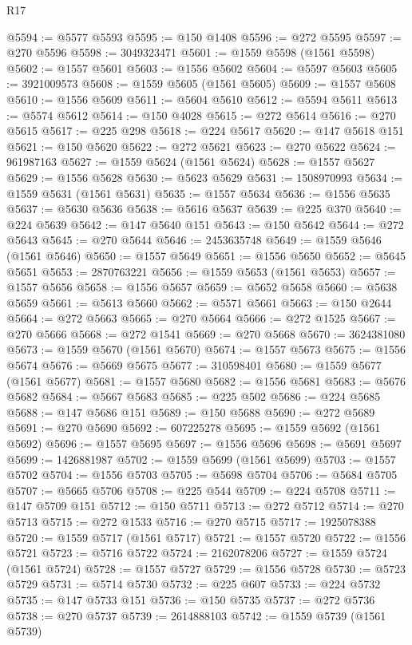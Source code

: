 \begin{lexlean}{R17}
\begin{coremodule}
@5594 := @5577 @5593
@5595 := @150 @1408
@5596 := @272 @5595
@5597 := @270 @5596
@5598 := 3049323471
@5601 := @1559 @5598 (@1561 @5598)
@5602 := @1557 @5601
@5603 := @1556 @5602
@5604 := @5597 @5603
@5605 := 3921009573
@5608 := @1559 @5605 (@1561 @5605)
@5609 := @1557 @5608
@5610 := @1556 @5609
@5611 := @5604 @5610
@5612 := @5594 @5611
@5613 := @5574 @5612
@5614 := @150 @4028
@5615 := @272 @5614
@5616 := @270 @5615
@5617 := @225 @298
@5618 := @224 @5617
@5620 := @147 @5618 @151
@5621 := @150 @5620
@5622 := @272 @5621
@5623 := @270 @5622
@5624 := 961987163
@5627 := @1559 @5624 (@1561 @5624)
@5628 := @1557 @5627
@5629 := @1556 @5628
@5630 := @5623 @5629
@5631 := 1508970993
@5634 := @1559 @5631 (@1561 @5631)
@5635 := @1557 @5634
@5636 := @1556 @5635
@5637 := @5630 @5636
@5638 := @5616 @5637
@5639 := @225 @370
@5640 := @224 @5639
@5642 := @147 @5640 @151
@5643 := @150 @5642
@5644 := @272 @5643
@5645 := @270 @5644
@5646 := 2453635748
@5649 := @1559 @5646 (@1561 @5646)
@5650 := @1557 @5649
@5651 := @1556 @5650
@5652 := @5645 @5651
@5653 := 2870763221
@5656 := @1559 @5653 (@1561 @5653)
@5657 := @1557 @5656
@5658 := @1556 @5657
@5659 := @5652 @5658
@5660 := @5638 @5659
@5661 := @5613 @5660
@5662 := @5571 @5661
@5663 := @150 @2644
@5664 := @272 @5663
@5665 := @270 @5664
@5666 := @272 @1525
@5667 := @270 @5666
@5668 := @272 @1541
@5669 := @270 @5668
@5670 := 3624381080
@5673 := @1559 @5670 (@1561 @5670)
@5674 := @1557 @5673
@5675 := @1556 @5674
@5676 := @5669 @5675
@5677 := 310598401
@5680 := @1559 @5677 (@1561 @5677)
@5681 := @1557 @5680
@5682 := @1556 @5681
@5683 := @5676 @5682
@5684 := @5667 @5683
@5685 := @225 @502
@5686 := @224 @5685
@5688 := @147 @5686 @151
@5689 := @150 @5688
@5690 := @272 @5689
@5691 := @270 @5690
@5692 := 607225278
@5695 := @1559 @5692 (@1561 @5692)
@5696 := @1557 @5695
@5697 := @1556 @5696
@5698 := @5691 @5697
@5699 := 1426881987
@5702 := @1559 @5699 (@1561 @5699)
@5703 := @1557 @5702
@5704 := @1556 @5703
@5705 := @5698 @5704
@5706 := @5684 @5705
@5707 := @5665 @5706
@5708 := @225 @544
@5709 := @224 @5708
@5711 := @147 @5709 @151
@5712 := @150 @5711
@5713 := @272 @5712
@5714 := @270 @5713
@5715 := @272 @1533
@5716 := @270 @5715
@5717 := 1925078388
@5720 := @1559 @5717 (@1561 @5717)
@5721 := @1557 @5720
@5722 := @1556 @5721
@5723 := @5716 @5722
@5724 := 2162078206
@5727 := @1559 @5724 (@1561 @5724)
@5728 := @1557 @5727
@5729 := @1556 @5728
@5730 := @5723 @5729
@5731 := @5714 @5730
@5732 := @225 @607
@5733 := @224 @5732
@5735 := @147 @5733 @151
@5736 := @150 @5735
@5737 := @272 @5736
@5738 := @270 @5737
@5739 := 2614888103
@5742 := @1559 @5739 (@1561 @5739)

\end{coremodule}
\end{lexlean}

